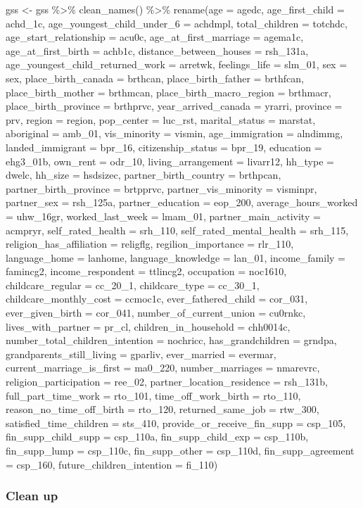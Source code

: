\documentclass[
]{article}
\begin{document}
gss \textless- gss \%\textgreater\% clean\_names() \%\textgreater\%
rename(age = agedc, age\_first\_child = achd\_1c,
age\_youngest\_child\_under\_6 = achdmpl, total\_children = totchdc,
age\_start\_relationship = acu0c, age\_at\_first\_marriage = agema1c,
age\_at\_first\_birth = achb1c, distance\_between\_houses = rsh\_131a,
age\_youngest\_child\_returned\_work = arretwk, feelings\_life =
slm\_01, sex = sex, place\_birth\_canada = brthcan, place\_birth\_father
= brthfcan, place\_birth\_mother = brthmcan, place\_birth\_macro\_region
= brthmacr, place\_birth\_province = brthprvc, year\_arrived\_canada =
yrarri, province = prv, region = region, pop\_center = luc\_rst,
marital\_status = marstat, aboriginal = amb\_01, vis\_minority = vismin,
age\_immigration = alndimmg, landed\_immigrant = bpr\_16,
citizenship\_status = bpr\_19, education = ehg3\_01b, own\_rent =
odr\_10, living\_arrangement = livarr12, hh\_type = dwelc, hh\_size =
hsdsizec, partner\_birth\_country = brthpcan, partner\_birth\_province =
brtpprvc, partner\_vis\_minority = visminpr, partner\_sex = rsh\_125a,
partner\_education = eop\_200, average\_hours\_worked = uhw\_16gr,
worked\_last\_week = lmam\_01, partner\_main\_activity = acmpryr,
self\_rated\_health = srh\_110, self\_rated\_mental\_health = srh\_115,
religion\_has\_affiliation = religflg, regilion\_importance = rlr\_110,
language\_home = lanhome, language\_knowledge = lan\_01, income\_family
= famincg2, income\_respondent = ttlincg2, occupation = noc1610,
childcare\_regular = cc\_20\_1, childcare\_type = cc\_30\_1,
childcare\_monthly\_cost = ccmoc1c, ever\_fathered\_child = cor\_031,
ever\_given\_birth = cor\_041, number\_of\_current\_union = cu0rnkc,
lives\_with\_partner = pr\_cl, children\_in\_household = chh0014c,
number\_total\_children\_intention = nochricc, has\_grandchildren =
grndpa, grandparents\_still\_living = gparliv, ever\_married = evermar,
current\_marriage\_is\_first = ma0\_220, number\_marriages = nmarevrc,
religion\_participation = ree\_02, partner\_location\_residence =
rsh\_131b, full\_part\_time\_work = rto\_101, time\_off\_work\_birth =
rto\_110, reason\_no\_time\_off\_birth = rto\_120, returned\_same\_job =
rtw\_300, satisfied\_time\_children = sts\_410,
provide\_or\_receive\_fin\_supp = csp\_105, fin\_supp\_child\_supp =
csp\_110a, fin\_supp\_child\_exp = csp\_110b, fin\_supp\_lump =
csp\_110c, fin\_supp\_other = csp\_110d, fin\_supp\_agreement =
csp\_160, future\_children\_intention = fi\_110)

\hypertarget{clean-up}{%
\subsubsection{Clean up}\label{clean-up}}
\end{document}
